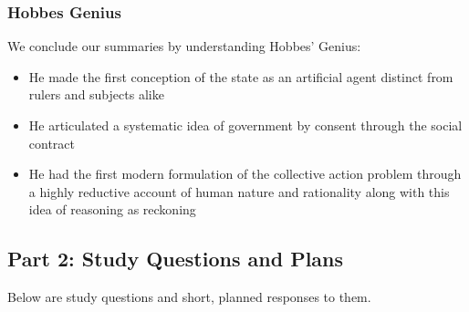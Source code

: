 \documentclass[12pt, letterpaper]{article}
\begin{document}
\subsubsection{Hobbes Genius}
We conclude our summaries by understanding Hobbes' Genius:
\begin{itemize}
	\item He made the first conception of the state as an artificial agent distinct from rulers and subjects alike
	\item He articulated a systematic idea of government by consent through the social contract
	\item He had the first modern formulation of the collective action problem through a highly reductive account of human nature and rationality along with this idea of reasoning as reckoning
\end{itemize}

\subsection{Part 2: Study Questions and Plans}
Below are study questions and short, planned responses to them.
\end{document}
